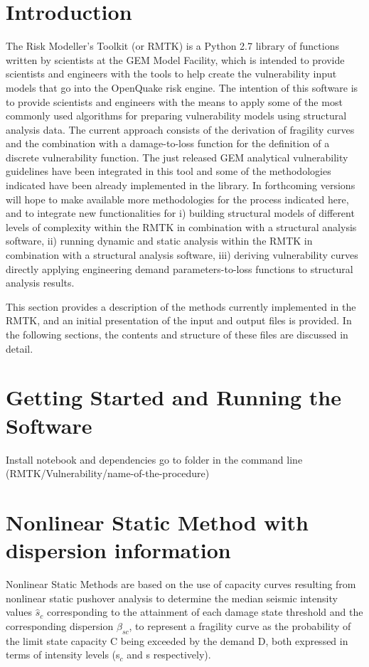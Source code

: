 
\section{Introduction}
The Risk Modeller's Toolkit (or RMTK) is a Python 2.7 library of functions written by scientists at the GEM Model Facility, which is intended to provide scientists and engineers with the tools to help create the vulnerability input models that go into the OpenQuake risk engine. The intention of this software is to provide scientists and engineers with the means to apply some of the most commonly used algorithms for preparing vulnerability models using structural analysis data. The current approach consists of the derivation of fragility curves and the combination with a damage-to-loss function for the definition of a discrete vulnerability function. The just released GEM analytical vulnerability guidelines have been integrated in this tool and some of the methodologies indicated have been already implemented in the library. In forthcoming versions will hope to make available more methodologies for the process indicated here, and to integrate new functionalities for i) building structural models of different levels of complexity within the RMTK in combination with a structural analysis software, ii) running dynamic and static analysis within the RMTK in combination with a structural analysis software, iii) deriving vulnerability curves directly applying engineering demand parameters-to-loss functions to structural analysis results.

This section provides a description of the methods currently implemented in the RMTK, and an initial presentation of the input and output files is provided. In the following sections, the contents and structure of these files are discussed in detail.

\section{Getting Started and Running the Software}
Install notebook and dependencies
go to folder in the command line (RMTK/Vulnerability/name-of-the-procedure)
 
\section{Nonlinear Static Method with dispersion information}
Nonlinear Static Methods are based on the use of capacity curves resulting from nonlinear static pushover analysis to determine the median seismic intensity values $\hat{s}_c$ corresponding to the attainment of each damage state threshold and the corresponding dispersion $\beta_{sc}$, to represent a fragility curve as the probability of the limit state capacity C being exceeded by the demand D, both expressed in terms of intensity levels (s$_c$ and s respectively).

